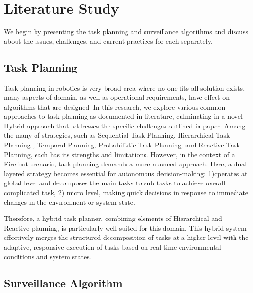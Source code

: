 \chapter{Literature Study}

We begin by presenting the task planning and surveillance algorithms and discuss about the issues, challenges, and current practices for each separately.


\section{Task Planning}
\label{sec:Task Planning}
Task planning in robotics is very broad area where no one fits all solution exists,  many  aspects of domain, as well as  operational requirements, have effect on algorithms that are designed. In this research, we explore various common approaches to task planning as documented in literature, culminating in a novel Hybrid approach that addresses the specific challenges outlined in paper \cite{Mansouri2021Combining}.Among the many of strategies, such as Sequential Task Planning, Hierarchical Task Planning \cite{Kosak2020MapleSwarm}, Temporal Planning, Probabilistic Task Planning, and Reactive Task Planning, each has its strengths and limitations. However, in the context of a Fire bot scenario, task planning demands a more nuanced approach. Here, a dual-layered strategy becomes essential for autonomous decision-making: 1)operates at global level and decomposes the main tasks  to sub tasks to achieve overall complicated task, 2) micro level, making quick decisions in response to immediate changes in the environment or system state.

Therefore, a hybrid task planner, combining elements of Hierarchical and Reactive planning, is particularly well-suited for this domain. This hybrid system effectively merges the structured decomposition of tasks at a higher level with the adaptive, responsive execution of tasks based on real-time environmental conditions and system states. 







\section{Surveillance Algorithm}
\label{sec:Surveillance Algorithm}

